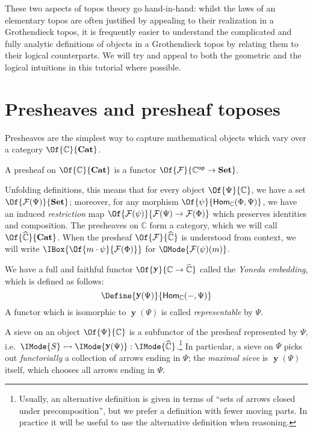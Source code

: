 \documentclass{article}
\newcommand\Cats{\mathbf{Cat}}
\newcommand\Sets{\mathbf{Set}}
\newcommand\OpCat[1]{{{#1}^{\mathsf{op}}}}
\newcommand\Hom[3]{\mathsf{Hom}_{#1} (#2, #3)}
\DeclareMathOperator\OpYoneda{\mathbf{y}}
\newcommand\Yoneda[1]{\OpYoneda({#1})}
\newcommand\Psh[1]{\widehat{#1}}
\newcommand\IsSubobject[3]{\IMode{#1}\rightarrowtail\IMode{#2}:\IMode{#3}}
\begin{document}
These two aspects of topos theory go hand-in-hand: whilst the laws of
an elementary topos are often justified by appealing to their
realization in a Grothendieck topos, it is frequently easier to
understand the complicated and fully analytic definitions of objects
in a Grothendieck topos by relating them to their logical
counterparts. We will try and appeal to both the geometric and the
logical intuitions in this tutorial where possible.

\section{Presheaves and presheaf toposes}
Presheaves are the simplest way to capture mathematical objects which
vary over a category $\Of{\mathbb{C}}{\Cats}$.

\begin{definition}[Presheaf]
  A presheaf on $\Of{\mathbb{C}}{\Cats}$ is a functor
  $\Of{\mathcal{F}}{\OpCat{\mathbb{C}}\to\Sets}$.
\end{definition}

Unfolding definitions, this means that for every object
$\Of{\Psi}{\mathbb{C}}$, we have a set
$\Of{\mathcal{F}(\Psi)}{\Sets}$; moreover, for any morphism
$\Of{\psi}{\Hom{\mathbb{C}}{\Phi}{\Psi}}$, we have an induced
\emph{restriction} map
$\Of{\mathcal{F}(\psi)}{\mathcal{F}(\Psi)\to \mathcal{F}(\Phi)}$ which preserves
identities and composition.
%
The presheaves on $\mathbb{C}$ form a category, which we will call
$\Of{\Psh{\mathbb{C}}}{\Cats}$.  When the presheaf
$\Of{\mathcal{F}}{\Psh{\mathbb{C}}}$ is understood from context, we
will write $\IBox{\Of{m\cdot \psi}{\mathcal{F}(\Phi)}}$ for
$\OMode{\mathcal{F}(\psi)(m)}$.

\begin{definition}
  We have a full and faithful functor
  $\Of{\OpYoneda}{\mathbb{C}\to\Psh{\mathbb{C}}}$ called the
  \emph{Yoneda embedding}, which is defined as follows:
  \[
    \Define{
      \Yoneda{\Psi}
    }{
      \Hom{\mathbb{C}}{-}{\Psi}
    }
  \]
  A functor which is isomorphic to $\Yoneda{\Psi}$ is called
  \emph{representable} by $\Psi$.
\end{definition}

\begin{definition}[Sieve]
  A sieve on an object $\Of{\Psi}{\mathbb{C}}$ is a subfunctor of the
  presheaf represented by $\Psi$, i.e.\
  $\IsSubobject{S}{\Yoneda{\Psi}}{\Psh{\mathbb{C}}}$.\footnote{Usually, an alternative
    definition is given in terms of ``sets of arrows closed under
    precomposition'', but we prefer a definition with fewer moving
    parts. In practice it will be useful to use the alternative
    definition when reasoning.}
%
  In particular, a sieve on $\Psi$ picks out \emph{functorially} a
  collection of arrows ending in $\Psi$; the \emph{maximal sieve} is
  $\Yoneda{\Psi}$ itself, which chooses all arrows ending in $\Psi$.
\end{definition}
\end{document}
